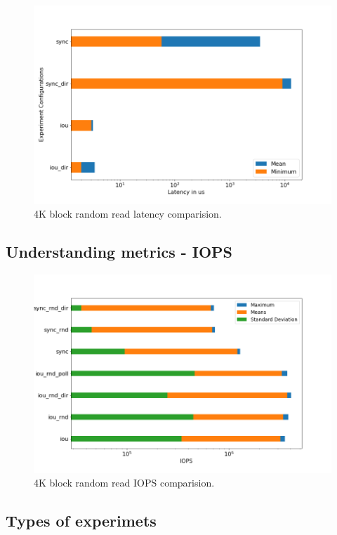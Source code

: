 \documentclass{article}
\begin{document}
\begin{figure}
    \centering
    \includegraphics[scale = 0.25]{latency.png}
    \caption{4K block random read latency comparision.}
    \label{Figure1}
\end{figure}

\subsection{Understanding metrics - IOPS}

\begin{figure}
    \centering
    \includegraphics[scale = 0.25]{iops.png}
    \caption{4K block random read IOPS comparision.}
    \label{Figure2}
\end{figure}

\subsection{Types of experimets}
\end{document}
